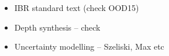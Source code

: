 
\begin{itemize}
\item IBR standard text (check OOD15)\cite{Zitnick:2004:viewinterp}
\item Depth synthesis -- check \cite{chaurasia13}
\item Uncertainty modelling -- \cite{devernay} Szeliski, Max etc
\end{itemize}
